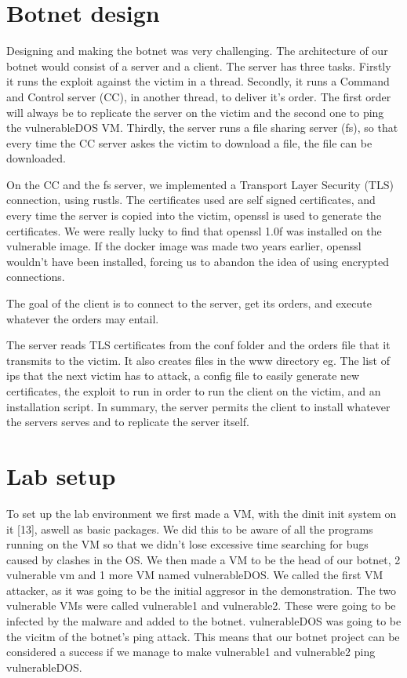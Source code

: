 \documentclass[../main.tex]{subfiles}
\begin{document}
    \section{Botnet design}

    Designing and making the botnet was very challenging. 
    The architecture of our botnet would consist of a server and a client. The server has three tasks. 
    Firstly it runs the exploit against the victim in a thread.
    Secondly, it runs a Command and Control server (CC), in another thread, to deliver it's order.
    The first order will always be to replicate the server on the victim and the second one to ping the vulnerableDOS VM.
    Thirdly, the server runs a file sharing server (fs), so that every time the CC server askes the victim to download a file, the file can be downloaded.

    On the CC and the fs server, we implemented a Transport Layer Security (TLS) connection, using rustls. 
    The certificates used are self signed certificates, and every time the server is copied into the victim, openssl is used to generate the certificates.
    We were really lucky to find that openssl 1.0f was installed on the vulnerable image. 
    If the docker image was made two years earlier, openssl wouldn't have been installed, forcing us to abandon the idea of using encrypted connections.

    The goal of the client is to connect to the server, get its orders, and execute whatever the orders may entail.

    The server reads TLS certificates from the conf folder and the orders file that it transmits to the victim.
    It also creates files in the www directory eg. The list of ips that the next victim has to attack, a config file to easily generate new certificates, the exploit to run in order to run the client on the victim, and an installation script. In summary, the server permits the client to install whatever the servers serves and to replicate the server itself.

    \vspace{10pt}

    \section{Lab setup}

    To set up the lab environment we first made a VM, with the dinit init system on it [13], aswell as basic packages.
    We did this to be aware of all the programs running on the VM so that we didn't lose excessive time searching for bugs caused by clashes in the OS.
    We then made a VM to be the head of our botnet, 2 vulnerable vm and 1 more VM named vulnerableDOS.
    We called the first VM attacker, as it was going to be the initial aggresor in the demonstration.
    The two vulnerable VMs were called vulnerable1 and vulnerable2.
    These were going to be infected by the malware and added to the botnet.
    vulnerableDOS was going to be the vicitm of the botnet's ping attack.
    This means that our botnet project can be considered a success if we manage to make vulnerable1 and vulnerable2 ping vulnerableDOS.
\end{document}
